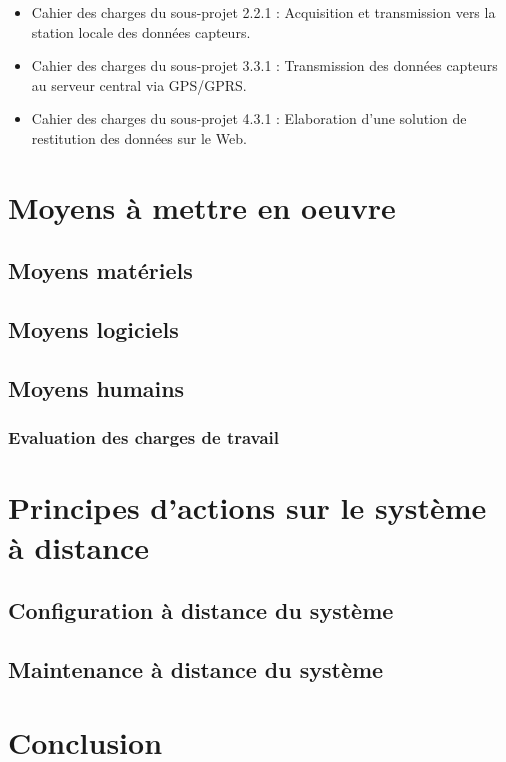 \begin{itemize}
\item Cahier des charges du sous-projet 2.2.1 : Acquisition et transmission vers la station locale des données capteurs.
\item Cahier des charges du sous-projet 3.3.1 : Transmission des données capteurs au serveur central via GPS/GPRS.
\item Cahier des charges du sous-projet 4.3.1 : Elaboration d'une solution de restitution des données sur le Web.
\end{itemize}



\section{Moyens à mettre en oeuvre}
\subsection{Moyens matériels}
\subsection{Moyens logiciels}
\subsection{Moyens humains}
\subsubsection{Evaluation des charges de travail}

\section{Principes d'actions sur le système à distance}
\subsection{Configuration à distance du système}
\subsection{Maintenance à distance du système}
\section{Conclusion}






